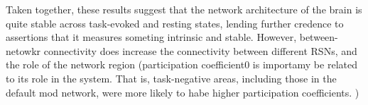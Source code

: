 
Taken together, these results suggest that the network architecture of the brain is quite stable across task-evoked and resting states, lending further credence to assertions that it measures someting intrinsic and stable. However, between-netowkr connectivity does increase the connectivity between different RSNs, and the role of the network region (participation coefficient0 is importamy be related to its  role in the system. That is, task-negative areas, including those in the default mod network, were more likely to habe higher participation coefficients. )